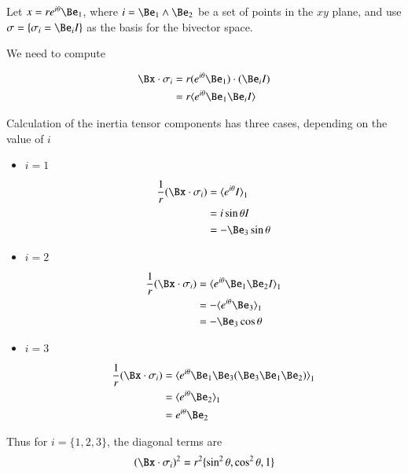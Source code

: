 \documentclass{article}      %
\begin{document}
Let $x = re^{i\theta}\Be_1$, where $i=\Be_1 \wedge \Be_2$ be a set of points in the $xy$ plane, and use $\sigma = \{\sigma_i = \Be_i I\}$ as the basis for the  bivector space.

We need to compute

\begin{align*}
\Bx \cdot \sigma_i 
&= r(e^{i\theta} \Be_1) \cdot ( \Be_i I ) \\
&= r\langle{ e^{i\theta} \Be_1 \Be_i I }\rangle \\
\end{align*}

Calculation of the inertia tensor components has three cases, depending on the value of $i$

\begin{itemize}
\item $i=1$

\begin{align*}
\frac{1}{r}(\Bx \cdot \sigma_i) 
&= {\langle e^{i\theta} I\rangle}_1 \\
&= i \sin\theta I \\
&= - \Be_3 \sin\theta \\
\end{align*}

\item $i=2$

\begin{align*}
\frac{1}{r}(\Bx \cdot \sigma_i) 
&= {\langle e^{i\theta} \Be_1 \Be_2 I\rangle}_1 \\
&= -{\langle e^{i\theta} \Be_3 \rangle}_1 \\
&= - \Be_3 \cos\theta \\
\end{align*}

\item $i=3$

\begin{align*}
\frac{1}{r}(\Bx \cdot \sigma_i) 
&= {\langle e^{i\theta} \Be_1 \Be_3 (\Be_3 \Be_1 \Be_2) \rangle}_1 \\
&= {\langle e^{i\theta} \Be_2 \rangle}_1 \\
&= e^{i\theta} \Be_2 \\
\end{align*}

\end{itemize}

Thus for $i=\{1, 2, 3\}$, the diagonal terms are
\[
(\Bx \cdot \sigma_i)^2 = r^2 \{ \sin^2 \theta, \cos^2 \theta, 1\}
\]
\end{document}
